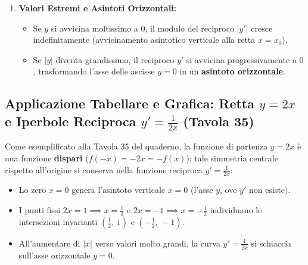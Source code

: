 \documentclass[11pt,a4paper,oneside]{report}
\begin{document}
\begin{metodo}
\begin{enumerate}[leftmargin=2em]
    \item \textbf{Valori Estremi e Asintoti Orizzontali:}
    \begin{itemize}
        \item Se $y$ si avvicina moltissimo a $0$, il modulo del reciproco $|y'|$ cresce indefinitamente (avvicinamento asintotico verticale alla retta $x = x_0$).
        \item Se $|y|$ diventa grandissimo, il reciproco $y'$ si avvicina progressivamente a $0$, trasformando l'asse delle ascisse $y = 0$ in un \textbf{asintoto orizzontale}.
    \end{itemize}
\end{enumerate}
\end{metodo}

\subsection*{Applicazione Tabellare e Grafica: Retta $y = 2x$ e Iperbole Reciproca $y' = \frac{1}{2x}$ (Tavola 35)}
Come esemplificato alla Tavola 35 del quaderno, la funzione di partenza $y = 2x$ \`e una funzione \textbf{dispari} ($f(-x) = -2x = -f(x)$); tale simmetria centrale rispetto all'origine si conserva nella funzione reciproca $y' = \frac{1}{2x}$:
\begin{itemize}
    \item Lo zero $x = 0$ genera l'asintoto verticale $x = 0$ (l'asse $y$, ove $y'$ non esiste).
    \item I punti fissi $2x = 1 \implies x = \frac{1}{2}$ e $2x = -1 \implies x = -\frac{1}{2}$ individuano le intersezioni invarianti $\left(\frac{1}{2}, \, 1\right)$ e $\left(-\frac{1}{2}, \, -1\right)$.
    \item All'aumentare di $|x|$ verso valori molto grandi, la curva $y' = \frac{1}{2x}$ si schiaccia sull'asse orizzontale $y = 0$.
\end{itemize}
\end{document}
